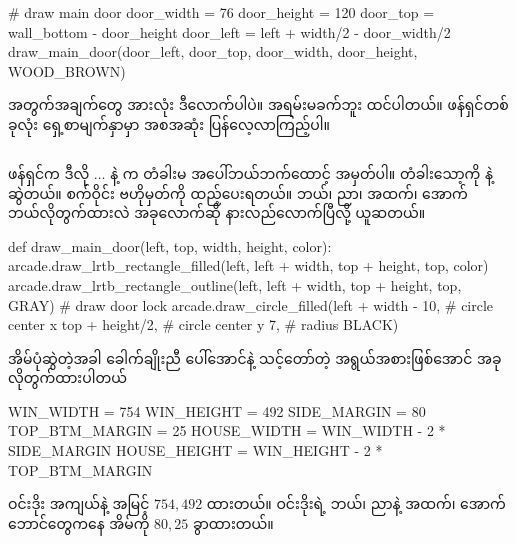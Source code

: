%
\begin{py}
# draw main door
door_width = 76
door_height = 120
door_top = wall_bottom - door_height
door_left = left + width/2 - door_width/2
draw_main_door(door_left, door_top,
               door_width, door_height,
               WOOD_BROWN)
\end{py}
%
အတွက်အချက်တွေ အားလုံး ဒီလောက်ပါပဲ။ အရမ်းမခက်ဘူး ထင်ပါတယ်။  ဖန်ရှင်တစ်ခုလုံး ရှေ့စာမျက်နှာမှာ အစအဆုံး ပြန်လေ့လာကြည့်ပါ။

\subsection*{}
 ဖန်ရှင်က ဒီလို $\ldots$  နဲ့  က တံခါးမ အပေါ်ဘယ်ဘက်ထောင့် အမှတ်ပါ။ တံခါးသော့ကို  နဲ့  ဆွဲတယ်။ စက်ဝိုင်း ဗဟိုမှတ်ကို ထည့်ပေးရတယ်။ ဘယ်၊ ညာ၊ အထက်၊ အောက် ဘယ်လိုတွက်ထားလဲ အခုလောက်ဆို နားလည်လောက်ပြီလို့ ယူဆတယ်။ 
%
\begin{py}
def draw_main_door(left, top, width, height, color):
    arcade.draw_lrtb_rectangle_filled(left, left + width,
                                      top + height, top,
                                      color)
    arcade.draw_lrtb_rectangle_outline(left, left + width,
                                       top + height, top,
                                       GRAY)
    # draw door lock
    arcade.draw_circle_filled(left + width - 10,  # circle center x 
                              top + height/2,     # circle center y
                              7,                  # radius
                              BLACK)
\end{py}
%

အိမ်ပုံဆွဲတဲ့အခါ ခေါက်ချိုးညီ ပေါ်အောင်နဲ့ သင့်တော်တဲ့ အရွယ်အစားဖြစ်အောင် အခုလိုတွက်ထားပါတယ်
%
\begin{py}
WIN_WIDTH = 754
WIN_HEIGHT = 492
SIDE_MARGIN = 80
TOP_BTM_MARGIN = 25
HOUSE_WIDTH = WIN_WIDTH - 2 * SIDE_MARGIN
HOUSE_HEIGHT = WIN_HEIGHT - 2 * TOP_BTM_MARGIN
\end{py}
% 
ဝင်းဒိုး အကျယ်နဲ့ အမြင့် $754, 492$  ထားတယ်။ ဝင်းဒိုးရဲ့ ဘယ်၊ ညာနဲ့ အထက်၊ အောက် ဘောင်တွေကနေ အိမ်ကို  $80, 25$  ခွာထားတယ်။

